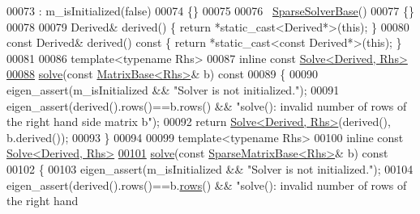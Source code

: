 \begin{DoxyCode}
00073       : m\_isInitialized(false)
00074     \{\}
00075 
00076     ~\hyperlink{group___sparse_core___module_class_eigen_1_1_sparse_solver_base}{SparseSolverBase}()
00077     \{\}
00078 
00079     Derived& derived() \{ \textcolor{keywordflow}{return} *\textcolor{keyword}{static\_cast<}Derived*\textcolor{keyword}{>}(\textcolor{keyword}{this}); \}
00080     \textcolor{keyword}{const} Derived& derived()\textcolor{keyword}{ const }\{ \textcolor{keywordflow}{return} *\textcolor{keyword}{static\_cast<}\textcolor{keyword}{const }Derived*\textcolor{keyword}{>}(\textcolor{keyword}{this}); \}
00081     
00086     \textcolor{keyword}{template}<\textcolor{keyword}{typename} Rhs>
00087     \textcolor{keyword}{inline} \textcolor{keyword}{const} \hyperlink{group___core___module_class_eigen_1_1_solve}{Solve<Derived, Rhs>}
\hyperlink{group___sparse_core___module_a4a66e9498b06e3ec4ec36f06b26d4e8f}{00088}     \hyperlink{group___sparse_core___module_a4a66e9498b06e3ec4ec36f06b26d4e8f}{solve}(\textcolor{keyword}{const} \hyperlink{group___core___module_class_eigen_1_1_matrix_base}{MatrixBase<Rhs>}& b)\textcolor{keyword}{ const}
00089 \textcolor{keyword}{    }\{
00090       eigen\_assert(m\_isInitialized && \textcolor{stringliteral}{"Solver is not initialized."});
00091       eigen\_assert(derived().rows()==b.rows() && \textcolor{stringliteral}{"solve(): invalid number of rows of the right hand side
       matrix b"});
00092       \textcolor{keywordflow}{return} \hyperlink{group___core___module_class_eigen_1_1_solve}{Solve<Derived, Rhs>}(derived(), b.derived());
00093     \}
00094     
00099     \textcolor{keyword}{template}<\textcolor{keyword}{typename} Rhs>
00100     \textcolor{keyword}{inline} \textcolor{keyword}{const} \hyperlink{group___core___module_class_eigen_1_1_solve}{Solve<Derived, Rhs>}
\hyperlink{group___sparse_core___module_a3a8d97173b6e2630f484589b3471cfc7}{00101}     \hyperlink{group___sparse_core___module_a3a8d97173b6e2630f484589b3471cfc7}{solve}(\textcolor{keyword}{const} \hyperlink{group___sparse_core___module_class_eigen_1_1_sparse_matrix_base}{SparseMatrixBase<Rhs>}& b)\textcolor{keyword}{ const}
00102 \textcolor{keyword}{    }\{
00103       eigen\_assert(m\_isInitialized && \textcolor{stringliteral}{"Solver is not initialized."});
00104       eigen\_assert(derived().rows()==b.\hyperlink{group___sparse_core___module_a1944e9fa9ce7937bfc3a87b2cb94371f}{rows}() && \textcolor{stringliteral}{"solve(): invalid number of rows of the right hand
}
\end{DoxyCode}
